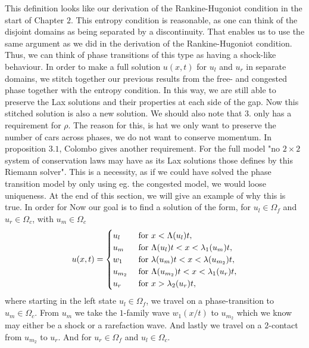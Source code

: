 \documentclass[10pt]{article}
\numberwithin{equation}{section}
\begin{document}
This definition looks like our derivation of the Rankine-Hugoniot condition in the start of Chapter $2$. This entropy condition is reasonable, as one can think of the disjoint domains as being separated by a discontinuity. That enables us to use the same argument as we did in the derivation of the Rankine-Hugoniot condition. Thus, we can think of phase transitions of this type as having a shock-like behaviour. In order to make a full solution $u(x,t)$ for $u_l$ and $u_r$ in separate domains, we stitch together our previous results from the free- and congested phase together with the entropy condition. In this way, we are still able to preserve the Lax solutions and their properties at each side of the gap. Now this stitched solution is also a new solution. We should also note that $3.$ only has a requirement for $\rho$. The reason for this, is hat we only want to preserve the number of cars across phases, we do not want to conserve momentum. In proposition $3.1$, Colombo gives another requirement. For the full model "no $2 \times 2$ system of conservation laws may have as its Lax solutions those defines by this Riemann solver"\cite[p.~713]{Colombo2003}. This is a necessity, as if we could have solved the phase transition model by only using eg. the congested model, we would loose uniqueness. At the end of this section, we will give an example of why this is true.
In order for  Now our goal is to find a solution of the form, for $u_l \in \Omega_f$ and $u_r \in \Omega_c$, with $u_m \in \Omega_c$
\begin{align}
    u(x,t) = \begin{cases}
        u_l & \text{ for $ x < \Lambda(u_l)t$}, \\
        u_{m} & \text{ for $ \Lambda(u_l)t < x < \lambda_1(u_{m})t$}, \\
        w_1 & \text{ for $\lambda(u_{m})t < x < \lambda(u_{m_2})t $}, \\
        u_{m_2} & \text{ for $ \Lambda(u_{m_2})t < x < \lambda_1(u_{r})t$}, \\
        u_r & \text{ for $x > \lambda_2( u_r)t$},
    \end{cases}
    \label{Eq:APrioriFreeToCong}
\end{align}
where starting in the left state $u_l \in \Omega_f$, we travel on a phase-transition to $u_m \in \Omega_c$. From $u_m$ we take the $1$-family wave $w_1(x/t)$ to $u_{m_2}$ which we know may either be a shock or a rarefaction wave. And lastly we travel on a $2$-contact from $u_{m_2}$ to $u_r$. And for $u_r \in \Omega_f$ and $u_l \in \Omega_c$.
\end{document}
